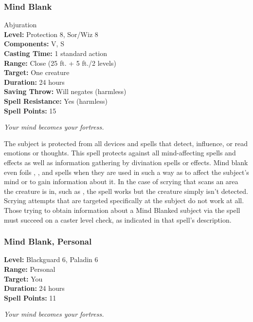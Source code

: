 \subsubsection{Mind Blank}
\label{Spell:MindBlank}
Abjuration
\\ \textbf{Level:} Protection 8, Sor/Wiz 8
\\ \textbf{Components:} V, S
\\ \textbf{Casting Time:} 1 standard action
\\ \textbf{Range:} Close (25 ft. + 5 ft./2 levels)
\\ \textbf{Target:} One creature
\\ \textbf{Duration:} 24 hours
\\ \textbf{Saving Throw:} Will negates (harmless)
\\ \textbf{Spell Resistance:} Yes (harmless)
\\ \textbf{Spell Points:} 15

\emph{Your mind becomes your fortress.}

The subject is protected from all devices and spells that detect, influence, or read emotions or thoughts. 
This spell protects against all mind-affecting spells and effects as well as information gathering by divination spells or effects. 
Mind blank even foils , , and  spells when they are used in such a way as to affect the subject's mind or to gain information about it. 
In the case of scrying that scans an area the creature is in, such as , the spell works but the creature simply isn't detected. 
Scrying attempts that are targeted specifically at the subject do not work at all.
Those trying to obtain information about a Mind Blanked subject via the  spell must succeed on a caster level check, as indicated in that spell's description. 

\subsubsection{Mind Blank, Personal}
\label{Spell:PersonalMindBlank}
\textbf{Level:} Blackguard 6, Paladin 6
\\ \textbf{Range:} Personal
\\ \textbf{Target:} You
\\ \textbf{Duration:} 24 hours
\\ \textbf{Spell Points:} 11

\emph{Your mind becomes your fortress.}

